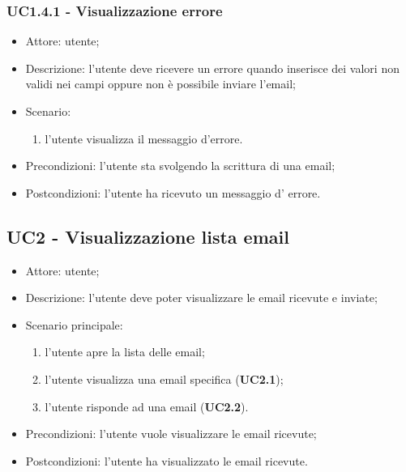     \subsubsection{UC1.4.1 - Visualizzazione errore }
    \begin{itemize}
        \item Attore: utente;
        \item Descrizione: l'utente deve ricevere un errore quando inserisce dei valori non validi nei campi oppure non è possibile inviare l'email;
        \item Scenario:
        \begin{enumerate}
        \item l'utente visualizza il messaggio d'errore.
        \end{enumerate}
        
        \item Precondizioni: l'utente sta svolgendo la scrittura di una email;
        \item Postcondizioni: l'utente ha ricevuto un messaggio d' errore.
    \end{itemize}

    \subsection{UC2 - Visualizzazione lista email}
    \begin{itemize}
        \item Attore: utente;
        \item Descrizione: l'utente deve poter visualizzare le email ricevute e inviate;
        \item Scenario principale:
            \begin{enumerate}
            \item l’utente apre la lista delle email;
            \item l'utente visualizza una email specifica (\textbf{UC2.1});
            \item l’utente risponde ad una email (\textbf{UC2.2}).
            \end{enumerate}
        \item Precondizioni: l'utente vuole visualizzare le email ricevute;
        \item Postcondizioni: l'utente ha visualizzato le email ricevute.
    \end{itemize}

